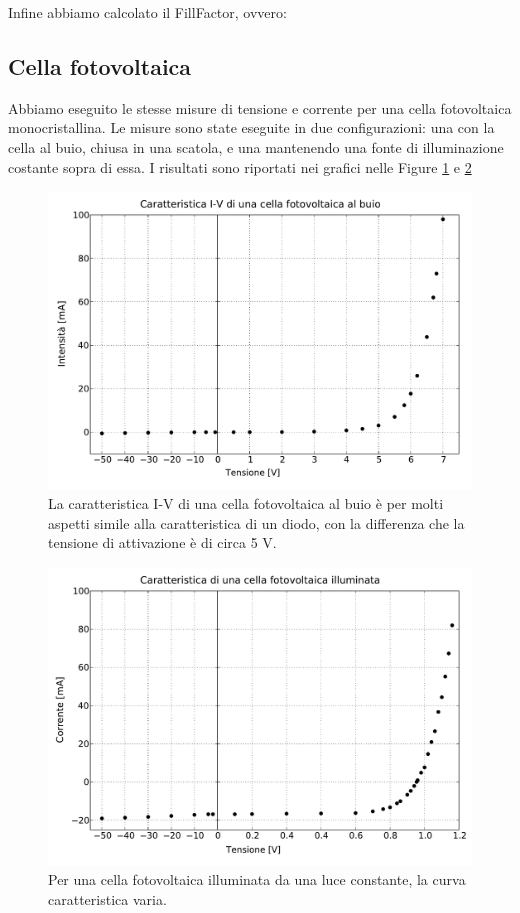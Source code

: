 Infine abbiamo calcolato il FillFactor, ovvero:

\subsection*{Cella fotovoltaica}

Abbiamo eseguito le stesse misure di tensione e corrente per una cella fotovoltaica monocristallina. Le misure sono state
eseguite in due configurazioni: una con la cella al buio, chiusa in una scatola, e una mantenendo una fonte di illuminazione costante
sopra di essa. I risultati sono riportati nei grafici nelle Figure \ref{fig:buio} e \ref{fig:luce}

\begin{figure}
    \includegraphics[scale=0.5]{buio.pdf}
    \caption{La caratteristica I-V di una cella fotovoltaica al buio è per molti aspetti simile alla caratteristica di un diodo,
        con la differenza che la tensione di attivazione è di circa 5 V.}
    \label{fig:buio}
\end{figure}

\begin{figure}
    \includegraphics[scale=0.5]{luce.pdf}
    \caption{Per una cella fotovoltaica illuminata da una luce constante, la curva caratteristica varia. }
    \label{fig:luce}
\end{figure}
